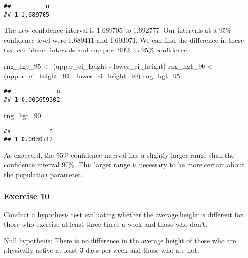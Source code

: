 \documentclass[
]{article}
\newenvironment{Shaded}{\begin{snugshade}}{\end{snugshade}}
\newcommand{\DecValTok}[1]{\textcolor[rgb]{0.00,0.00,0.81}{#1}}
\newcommand{\NormalTok}[1]{#1}
\newcommand{\OperatorTok}[1]{\textcolor[rgb]{0.81,0.36,0.00}{\textbf{#1}}}
\newcommand{\StringTok}[1]{\textcolor[rgb]{0.31,0.60,0.02}{#1}}
\begin{document}
\begin{verbatim}
##          n
## 1 1.689705
\end{verbatim}

The new confidence interval is 1.689705 to 1.692777. Our intervals at a
95\% confidence level were 1.689411 and 1.693071. We can find the
difference in these two confidence intervals and compare 90\% to 95\%
confidence.

\begin{Shaded}
\begin{Highlighting}[]
\NormalTok{rng_hgt_}\DecValTok{95}\NormalTok{ <-}\StringTok{ }\NormalTok{(upper_ci_height }\OperatorTok{-}\StringTok{ }\NormalTok{lower_ci_height)}
\NormalTok{rng_hgt_}\DecValTok{90}\NormalTok{ <-}\StringTok{ }\NormalTok{(upper_ci_height_}\DecValTok{90} \OperatorTok{-}\StringTok{ }\NormalTok{lower_ci_height_}\DecValTok{90}\NormalTok{)}
\NormalTok{rng_hgt_}\DecValTok{95}
\end{Highlighting}
\end{Shaded}

\begin{verbatim}
##             n
## 1 0.003659302
\end{verbatim}

\begin{Shaded}
\begin{Highlighting}[]
\NormalTok{rng_hgt_}\DecValTok{90}
\end{Highlighting}
\end{Shaded}

\begin{verbatim}
##           n
## 1 0.0030712
\end{verbatim}

As expected, the 95\% confidence interval has a slightly larger range
than the confidence interval 90\%. This larger range is necessary to be
more certain about the population parameter.

\hypertarget{exercise-10}{%
\subsubsection{Exercise 10}\label{exercise-10}}

Conduct a hypothesis test evaluating whether the average height is
different for those who exercise at least three times a week and those
who don't.

Null hypothesis: There is no difference in the average height of those
who are physically active at least 3 days per week and those who are
not.
\end{document}
